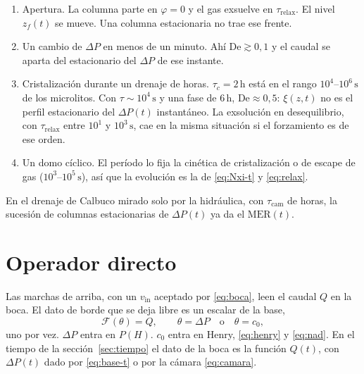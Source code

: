\documentclass[11pt,a4paper]{article}
\newcommand{\vin}{v_{\mathrm{in}}}
\begin{document}
\begin{enumerate}[leftmargin=1.2em,itemsep=0.35em]
\item Apertura. La columna parte en $\varphi=0$ y el gas exsuelve en
$\tau_{\mathrm{relax}}$. El nivel $z_f(t)$ se mueve. Una columna
estacionaria no trae ese frente.
\item Un cambio de $\Delta P$ en menos de un minuto. Ahí
$\mathrm{De}\gtrsim 0{,}1$ y el caudal se aparta del estacionario
del $\Delta P$ de ese instante.
\item Cristalización durante un drenaje de horas. $\tau_c=2\,\mathrm{h}$
está en el rango $10^{4}$--$10^{6}\,\mathrm{s}$ de los microlitos.
Con $\tau\sim 10^{4}\,\mathrm{s}$ y una fase de $6\,\mathrm{h}$,
$\mathrm{De}\approx 0{,}5$: $\xi(z,t)$ no es el perfil estacionario
del $\Delta P(t)$ instantáneo. La exsolución en desequilibrio, con
$\tau_{\mathrm{relax}}$ entre $10^{1}$ y $10^{3}\,\mathrm{s}$, cae
en la misma situación si el forzamiento es de ese orden.
\item Un domo cíclico. El período lo fija la cinética de
cristalización o de escape de gas ($10^{3}$--$10^{5}\,\mathrm{s}$),
así que la evolución es la de \eqref{eq:Nxi-t} y \eqref{eq:relax}.
\end{enumerate}

En el drenaje de Calbuco mirado solo por la hidráulica, con
$\tau_{\mathrm{cam}}$ de horas, la sucesión de columnas
estacionarias de $\Delta P(t)$ ya da el $\mathrm{MER}(t)$.

\section{Operador directo}

Las marchas de arriba, con un $\vin$ aceptado por \eqref{eq:boca},
leen el caudal $Q$ en la boca. El dato de borde que se deja libre
es un escalar de la base,
\begin{equation}
\label{eq:F}
\mathcal{F}(\theta)=Q,
\qquad
\theta=\Delta P
\quad\text{o}\quad
\theta=c_0,
\end{equation}
uno por vez. $\Delta P$ entra en $P(H)$. $c_0$ entra en Henry,
\eqref{eq:henry} y \eqref{eq:nad}. En el tiempo de la
sección~\ref{sec:tiempo} el dato de la boca es la función
$Q(t)$, con $\Delta P(t)$ dado por \eqref{eq:base-t} o por la
cámara \eqref{eq:camara}.
\end{document}
